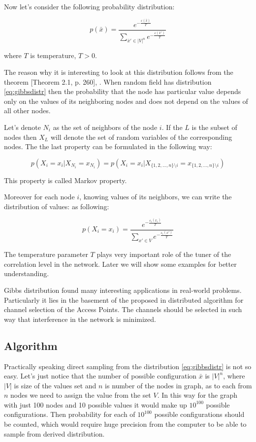 \documentclass[12pt]{report}
\begin{document}
Now let's consider the following probability distribution:

\begin{equation} \label{eq:gibbsdistr}
p(\bar{x}) = \frac{ e^{-\frac{ \varepsilon (\bar{x})}{T}} }{ \sum\limits_{\bar{x}'\in |V|^n} e^{-\frac{\varepsilon(\bar{x}')}{T}}} 
\end{equation}

where $T$ is temperature, $T > 0$.


The reason why it is interesting to look at this distribution follows from the theorem [Theorem 2.1, p. 260], \cite{bremaud2013markov}. When random field has distribution \ref{eq:gibbsdistr} then the probability that the node has particular value depends only on the values of its neighboring nodes and does not depend on the values of all other nodes.

Let's denote $N_i$ as the set of neighbors of the node $i$. If the $L$ is the subset of nodes then $X_{L}$ will denote the set of random variables of the corresponding nodes. 
The the last property can be formulated in the following way:

$$ p(X_i = x_i | X_{N_i} = x_{N_i}) = p(X_i = x_i | X_{\lbrace 1, 2, ..., n\rbrace \setminus i} = x_{\lbrace 1, 2, ..., n \rbrace \setminus i}) $$

This property is called Markov property.

Moreover for each node $i$, knowing values of its neighbors, we can write the distribution of values: as following:

$$ p(X_i = x_i) = \frac{ e^{-\frac{\varepsilon_i(x_i)}{T}} }{ \sum\limits_{x'\in V} e^{-\frac{\varepsilon_i(x')}{T}}} $$

The temperature parameter $T$ plays very important role of the tuner of the correlation level in the network. Later we will show some examples for better understanding. 


Gibbs distribution found many interesting applications in real-world problems. Particularly it lies in the basement of the proposed in \cite{kauffmann2007measurement} distributed algorithm for channel selection of the Access Points. The channels should be selected in such way that interference in the network is minimized. 

\subsection{Algorithm} 
\label{subsec:Algorithm}
Practically speaking direct sampling from the distribution \ref{eq:gibbsdistr} is not so easy. Let's just notice that the number of possible configuration $\bar{x}$ is $|V|^n$, where $|V|$ is size of the values set and $n$ is number of the nodes in graph, as to each from $n$ nodes we need to assign the value from the set $V$. 
In this way for the graph with just 100 nodes and 10 possible values it would make up $10^{100}$ possible configurations. Then probability for each of $10^{100}$ possible configurations should be counted, which would require huge precision from the computer to be able to sample from derived distribution.
\end{document}

